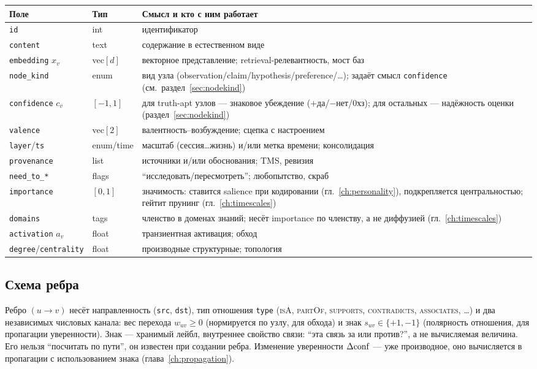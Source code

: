 \begin{longtable}{p{} p{} p{}}
\toprule
\textbf{Поле} & \textbf{Тип} & \textbf{Смысл и кто с ним работает} \\
\midrule
\endhead
\texttt{id} & int & идентификатор \\
\texttt{content} & text & содержание в естественном виде \\
\texttt{embedding} $x_v$ & vec$[d]$ & векторное представление; retrieval-релевантность, мост баз \\
\texttt{node\_kind} & enum & вид узла (observation\slash claim\slash hypothesis\slash preference\slash \dots); задаёт смысл \texttt{confidence} (см.\ раздел~\ref{sec:nodekind}) \\
\texttt{confidence} $c_v$ & $[-1, 1]$ & для truth-apt узлов --- знаковое убеждение ($+$да/$-$нет/$0$хз); для остальных --- надёжность оценки (раздел~\ref{sec:nodekind}) \\
\texttt{valence} & vec$[2]$ & валентность--возбуждение; сцепка с настроением \\
\texttt{layer}\slash\texttt{ts} & enum\slash time & масштаб (сессия\dots жизнь) и/или метка времени; консолидация \\
\texttt{provenance} & list & источники и/или обоснования; TMS, ревизия \\
\texttt{need\_to\_*} & flags & ``исследовать\slash пересмотреть''; любопытство, скраб \\
\texttt{importance} & $[0, 1]$ & значимость: ставится salience при кодировании (гл.~\ref{ch:personality}), подкрепляется центральностью; гейтит прунинг (гл.~\ref{ch:timescales}) \\
\texttt{domains} & tags & членство в доменах знаний; несёт importance по членству, а не диффузией (гл.~\ref{ch:timescales}) \\
\texttt{activation} $a_v$ & float & транзиентная активация; обход \\
\texttt{degree}\slash\texttt{centrality} & float & производные структурные; топология \\
\bottomrule
\end{longtable}

\subsection{Схема ребра}

Ребро $(u \to v)$ несёт направленность (\texttt{src}, \texttt{dst}), тип
отношения \texttt{type} (\textsc{isA}, \textsc{partOf}, \textsc{supports},
\textsc{contradicts}, \textsc{associates}, \dots) и два независимых числовых
канала: вес перехода $w_{uv} \ge 0$ (нормируется по узлу, для обхода) и знак
$s_{uv} \in \{+1, -1\}$ (полярность отношения, для пропагации уверенности).
Знак --- хранимый лейбл, внутреннее свойство связи: ``эта связь за или
против?'', а не вычисляемая величина. Его нельзя ``посчитать по пути'', он
известен при создании ребра. Изменение уверенности $\Delta \mathrm{conf}$ --- уже
производное, оно вычисляется в пропагации с использованием знака
(глава~\ref{ch:propagation}).


